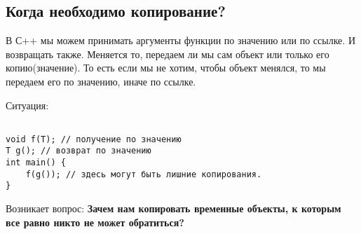 \subsection{Когда необходимо копирование?}
В С++ мы можем принимать аргументы функции по значению или по ссылке. И возвращать также. Меняется то, передаем ли мы сам объект или только его копию(значение). То есть если мы не хотим, чтобы объект менялся, то мы передаем его по значению, иначе по ссылке.


Ситуация:
\begin{verbatim}

void f(T); // получение по значению
T g(); // возврат по значению
int main() {
    f(g()); // здесь могут быть лишние копирования.
}
\end{verbatim}


Возникает вопрос: \textbf{Зачем нам копировать временные объекты, к которым все равно никто не может обратиться?}



